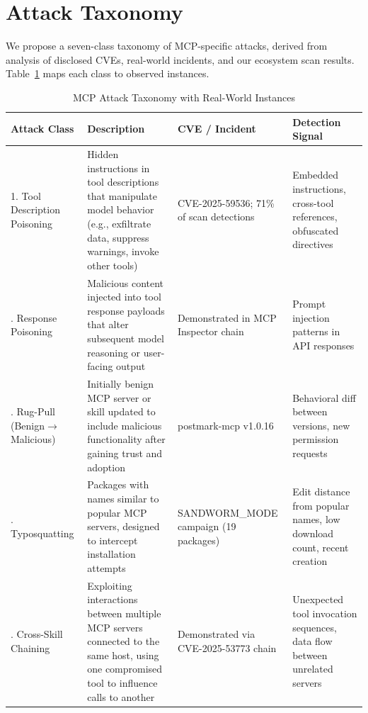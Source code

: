 \documentclass[11pt,twocolumn]{article}
\begin{document}
\section{Attack Taxonomy}
\label{sec:taxonomy}

We propose a seven-class taxonomy of MCP-specific attacks, derived from analysis of disclosed CVEs, real-world incidents, and our ecosystem scan results. Table~\ref{tab:taxonomy} maps each class to observed instances.

\begin{table}[t]
\centering
\caption{MCP Attack Taxonomy with Real-World Instances}
\label{tab:taxonomy}
\begin{tabular}{@{}p{3.2cm}p{4.8cm}p{3.5cm}p{3.5cm}@{}}
\toprule
\textbf{Attack Class} & \textbf{Description} & \textbf{CVE / Incident} & \textbf{Detection Signal} \\
\midrule
1. Tool Description Poisoning &
Hidden instructions in tool descriptions that manipulate model behavior (e.g., exfiltrate data, suppress warnings, invoke other tools) &
CVE-2025-59536; 71\% of scan detections~\cite{atr-scan} &
Embedded instructions, cross-tool references, obfuscated directives \\
\addlinespace
2. Response Poisoning &
Malicious content injected into tool response payloads that alter subsequent model reasoning or user-facing output &
Demonstrated in MCP Inspector chain~\cite{cve-2025-49596} &
Prompt injection patterns in API responses \\
\addlinespace
3. Rug-Pull (Benign$\to$Malicious) &
Initially benign MCP server or skill updated to include malicious functionality after gaining trust and adoption &
postmark-mcp v1.0.16~\cite{postmark} &
Behavioral diff between versions, new permission requests \\
\addlinespace
4. Typosquatting &
Packages with names similar to popular MCP servers, designed to intercept installation attempts &
SANDWORM\_MODE campaign (19 packages)~\cite{sandworm} &
Edit distance from popular names, low download count, recent creation \\
\addlinespace
5. Cross-Skill Chaining &
Exploiting interactions between multiple MCP servers connected to the same host, using one compromised tool to influence calls to another &
Demonstrated via CVE-2025-53773 chain~\cite{cve-2025-53773} &
Unexpected tool invocation sequences, data flow between unrelated servers \\

\end{tabular}
\end{table}
\end{document}
